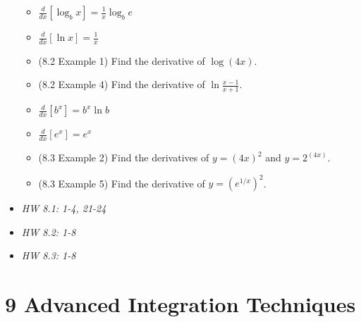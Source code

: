 \documentclass[11pt]{article}
\begin{document}
\begin{itemize}
\begin{itemize}
    \item \(\frac{d}{dx}[\log_b x]=\frac{1}{x}\log_b e\)
    \item \(\frac{d}{dx}[\ln x]=\frac{1}{x}\)
    \item (8.2 Example 1) Find the derivative of \(\log(4x)\).
    \item (8.2 Example 4) Find the derivative of \(\ln\frac{x-1}{x+1}\).
    \item \(\frac{d}{dx}[b^x]=b^x\ln b\)
    \item \(\frac{d}{dx}[e^x]=e^x\)
    \item (8.3 Example 2) Find the derivatives of \(y=(4x)^2\) and
          \(y=2^{(4x)}\).
    \item (8.3 Example 5) Find the derivative of \(y=(e^{1/x})^2\).
  \end{itemize}
\item\textit{
  HW 8.1: 1-4, 21-24
}
\item\textit{
  HW 8.2: 1-8
}
\item\textit{
  HW 8.3: 1-8
}
\end{itemize}

\section*{9 Advanced Integration Techniques}
\end{document}
